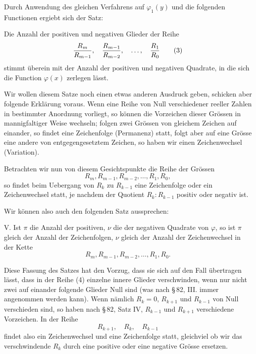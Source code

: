 \documentclass[11pt]{article}
\begin{document}
Durch Anwendung des gleichen Verfahrens auf $\varphi_1(y)$ und die folgenden Functionen ergiebt sich der Satz:

Die Anzahl der positiven und negativen Glieder der Reihe
\begin{equation}
        {R_m\over R_{m-1}},\quad {R_{m-1}\over R_{m-2}},\quad \ldots,\quad {R_1\over R_0}
\tag{3}
\end{equation}
stimmt \"uberein mit der Anzahl der positiven und negativen Quadrate, in die sich die Function $\varphi(x)$ zerlegen l\"asst.

Wir wollen diesem Satze noch einen etwas anderen Ausdruck geben, schicken aber folgende Erkl\"arung voraus. Wenn eine Reihe von Null verschiedener reeller Zahlen in bestimmter Anordnung vorliegt, so k\"onnen die Vorzeichen dieser Gr\"ossen in mannigfaltiger Weise wechseln; folgen zwei Gr\"ossen von gleichem Zeichen auf einander, so findet eine Zeichenfolge (Permanenz) statt, folgt aber auf eine Gr\"osse eine andere von entgegengesetztem Zeichen, so haben wir einen Zeichenwechsel (Variation).

Betrachten wir nun von diesem Gesichtspunkte die Reihe der Gr\"ossen
\[
        R_m,
        R_{m-1},
        R_{m-2},
        \ldots,
        R_1,
        R_0,
\]
so findet beim Uebergang von $R_k$ zu $R_{k-1}$ eine Zeichenfolge oder ein Zeichenwechsel statt, je nachdem der Quotient $R_k:R_{k-1}$ positiv oder negativ ist.

Wir k\"onnen also auch den folgenden Satz aussprechen:

V. Ist $\pi$ die Anzahl der positiven, $\nu$ die der negativen Quadrate von $\varphi$, so ist $\pi$ gleich der Anzahl der Zeichenfolgen, $\nu$ gleich der Anzahl der Zeichenwechsel in der Kette
\begin{equation}
        R_m,
        R_{m-1},
        R_{m-2},
        \ldots,
        R_1,
        R_0.
\tag{4}
\end{equation}

Diese Fassung des Satzes hat den Vorzug, dass sie sich auf den Fall \"ubertragen l\"asst, dass in der Reihe (4) einzelne innere Glieder verschwinden, wenn nur nicht zwei auf einander folgende Glieder Null sind (was nach \S\,82, III. immer angenommen werden kann). Wenn n\"amlich $R_k=0$, $R_{k+1}$ und $R_{k-1}$ von Null verschieden sind, so haben nach \S\,82, Satz IV, $R_{k-1}$ und $R_{k+1}$ verschiedene Vorzeichen. In der Reihe
\[
        R_{k+1},\quad R_k,
\quad R_{k-1}
\]
findet also ein Zeichenwechsel und eine Zeichenfolge statt, gleichviel ob wir das verschwindende $R_k$ durch eine positive oder eine negative Gr\"osse ersetzen.
\end{document}
